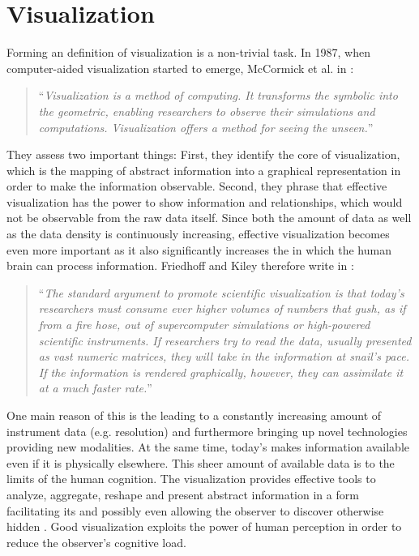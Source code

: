 \section{Visualization}
Forming an  definition of visualization is a non-trivial task.
In 1987, when computer-aided visualization started to emerge, McCormick et al.  in \cite{McCormick:1987:DefinitionOfVisualization}: 
\begin{quote}
	``\emph{Visualization is a method of computing. It transforms the symbolic into the geometric, enabling researchers to observe their simulations and computations. Visualization offers a method for seeing the unseen.}''
\end{quote}
They assess two important things:
First, they identify the core  of visualization, which is the mapping of abstract information into a graphical representation in order to make the information observable.
Second, they  phrase that effective visualization has the power to show information and relationships, which would not be observable from the raw data itself.
Since both the amount of data as well as the data density is continuously increasing, effective visualization becomes even more important as it also significantly increases the  in which the human brain can process information.
Friedhoff and Kiley therefore write in \cite{Friedhoff:1990:eye}:
\begin{quote}
	``\emph{The standard argument to promote scientific visualization is that today's researchers must consume ever higher volumes of numbers that gush, as if from a fire hose, out of supercomputer simulations or high-powered scientific instruments. 
	If researchers try to read the data, usually presented as vast numeric matrices, they will take in the information at snail's pace. 
	If the information is rendered graphically, however, they can assimilate it at a much faster rate.}''
\end{quote}
One main reason of this  is the  leading to a constantly increasing amount of instrument data (e.g. resolution) and furthermore bringing up novel technologies providing new modalities. 
At the same time, today's  makes information available even if it is physically elsewhere.
This sheer amount of available data is  to the limits of the human cognition.
The  visualization provides effective tools to analyze, aggregate, reshape and present abstract information in a form facilitating its  and possibly even allowing the observer to discover otherwise hidden .
Good visualization exploits the power of human perception in order to reduce the observer's cognitive load.

